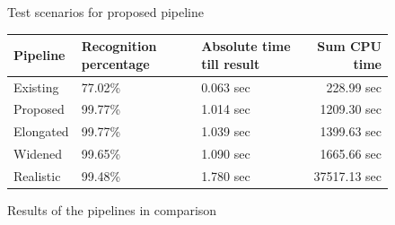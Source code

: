 \begin{figure}[]	
	\centering
	
	\caption{Test scenarios for proposed pipeline}
	\label{pic:eval_p3_5_diag}
\end{figure}

\begin{figure}[]
	\begin{tabular}{ | l | p{} | p{} | r|}
		\hline
		Pipeline 	& Recognition percentage & Absolute time till result & Sum CPU time \\ \hline
		Existing 	& 77.02\% & 0.063 sec &   228.99 sec \\ \hline
		Proposed 	& 99.77\% & 1.014 sec &  1209.30 sec \\ \hline
		Elongated 	& 99.77\% & 1.039 sec &  1399.63 sec \\ \hline
		Widened 	& 99.65\% & 1.090 sec &  1665.66 sec \\ \hline
		Realistic 	& 99.48\% & 1.780 sec & 37517.13 sec \\ \hline
	\end{tabular}
	\caption{Results of the pipelines in comparison}
	\label{table:eval_dataset_results}
\end{figure}

